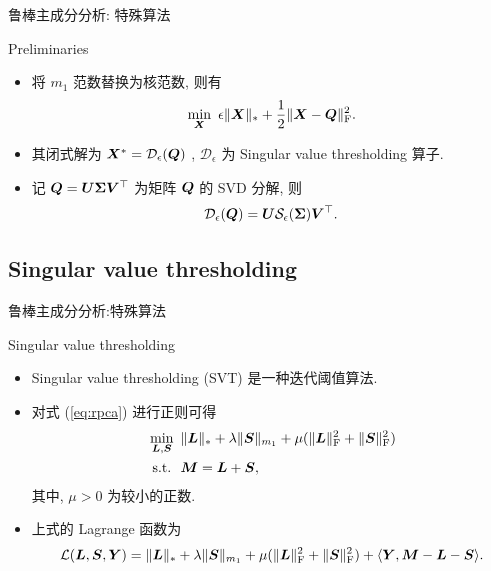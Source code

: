 \documentclass{beamer}
\begin{document}
\begin{frame}{鲁棒主成分分析: 特殊算法}
  \begin{block}{Preliminaries}
    \begin{itemize}
      \item 将 $m_1$ 范数替换为核范数, 则有
      \begin{equation}
        \min_{\bm{X}}~\epsilon\|\bm{X}\|_{*}+\frac{1}{2}\|\bm{X}-\bm{Q}\|_{\text{F}}^2.
      \end{equation}
      \item 其闭式解为 $\bm{X}^*=\mathcal{D}_\epsilon(\bm{Q})$ \cite{cai2010singular}, $\mathcal{D}_\epsilon$ 为 Singular value thresholding 算子.
      \item 记 $\bm{Q}=\bm{U}\bm{\Sigma}\bm{V}^\top$ 为矩阵 $\bm{Q}$ 的 SVD 分解, 则
      \begin{equation}
        \mathcal{D}_\epsilon(\bm{Q})=\bm{U}\mathcal{S}_\epsilon(\bm{\Sigma})\bm{V}^\top.
      \end{equation}
    \end{itemize}
  \end{block}
\end{frame}

\subsection{Singular value thresholding}
\label{subsec:svt}

\begin{frame}{鲁棒主成分分析:特殊算法}
  \begin{block}{Singular value thresholding}
    \begin{itemize}
      \item Singular value thresholding (SVT) \cite{cai2010singular} 是一种迭代阈值算法.
      \item 对式 (\ref{eq:rpca}) 进行正则可得
      \begin{equation}
        \begin{aligned}
          &\min_{\bm{L},\bm{S}}~\|\bm{L}\|_{*}+\lambda\|\bm{S}\|_{m_1}+\mu(\|\bm{L}\|_{\text{F}}^2+\|\bm{S}\|_{\text{F}}^2) \\
          &~\text{s.t.}~~\bm{M}=\bm{L}+\bm{S},
        \end{aligned}
      \end{equation}
      其中, $\mu>0$ 为较小的正数.
      \item 上式的 Lagrange 函数为
      \begin{equation}
        \mathcal{L}(\bm{L},\bm{S},\bm{Y})=\|\bm{L}\|_{*}+\lambda\|\bm{S}\|_{m_1}+\mu(\|\bm{L}\|_{\text{F}}^2+\|\bm{S}\|_{\text{F}}^2)+\langle\bm{Y},\bm{M}-\bm{L}-\bm{S}\rangle.
      \end{equation}
    \end{itemize}
  \end{block}
\end{frame}
\end{document}
